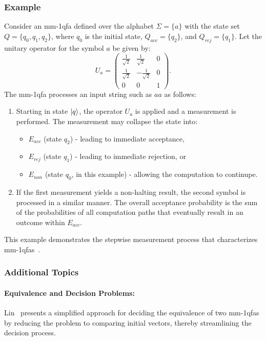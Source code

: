 \subsubsection{Example}
Consider an \gls{mm-1qfa} defined over the alphabet $\Sigma=\{a\}$ with the state set $Q=\{q_0,q_1,q_2\}$, where $q_0$ is the initial state, $Q_{acc}=\{q_2\}$, and $Q_{rej}=\{q_1\}$. Let the unitary operator for the symbol $a$ be given by:
\[
U_a = \begin{pmatrix}
\frac{1}{\sqrt{2}} & \frac{1}{\sqrt{2}} & 0 \\[1mm]
\frac{1}{\sqrt{2}} & -\frac{1}{\sqrt{2}} & 0 \\[1mm]
0 & 0 & 1
\end{pmatrix}.
\]
The \gls{mm-1qfa} processes an input string such as $aa$ as follows:
\begin{enumerate}
    \item Starting in state $\ket{q}$, the operator $U_a$ is applied and a measurement is performed. The measurement may collapse the state into:
    \begin{itemize}
        \item $E_{acc}$ (state $q_2$) - leading to immediate acceptance,
        \item $E_{rej}$ (state $q_1$) - leading to immediate rejection, or
        \item $E_{non}$ (state $q_0$, in this example) - allowing the computation to continupe.
    \end{itemize}
    \item If the first measurement yields a non-halting result, the second symbol is processed in a similar manner. The overall acceptance probability is the sum of the probabilities of all computation paths that eventually result in an outcome within $E_{acc}$.
\end{enumerate}
This example demonstrates the stepwise measurement process that characterizes \glspl{mm-1qfa}~\cite{kondacs1997power,lin2012another}.

\subsubsection{Additional Topics}
\paragraph{Equivalence and Decision Problems:} Lin~\cite{lin2012another} presents a simplified approach for deciding the equivalence of two \glspl{mm-1qfa} by reducing the problem to comparing initial vectors, thereby streamlining the decision process.

